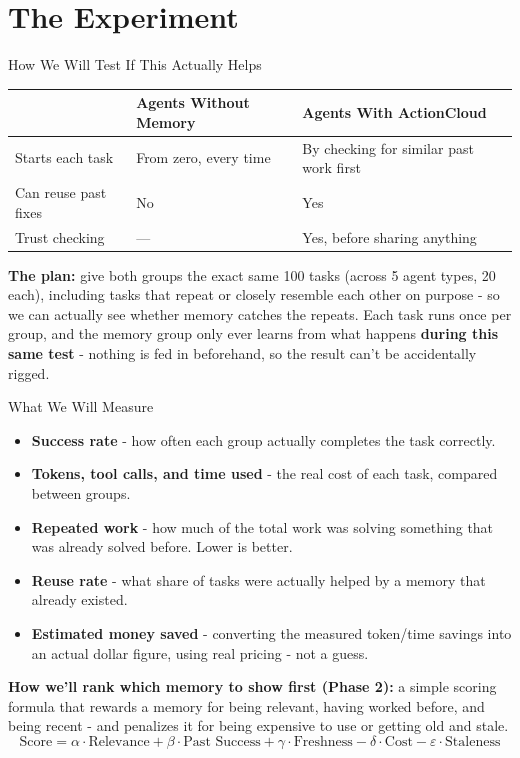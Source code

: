 \documentclass{beamer}
\begin{document}
\section{The Experiment}
\begin{frame}{How We Will Test If This Actually Helps}
\scriptsize
\setlength{\tabcolsep}{4pt}
\renewcommand{\arraystretch}{1.3}
\begin{tabular}{lll}
\toprule
\textbf{} & \textbf{Agents Without Memory} & \textbf{Agents With ActionCloud} \\
\midrule
Starts each task & From zero, every time & By checking for similar past work first \\
Can reuse past fixes & No & Yes \\
Trust checking & --- & Yes, before sharing anything \\
\bottomrule
\end{tabular}

\vspace{0.25cm}\normalsize
\textbf{The plan:} give both groups the exact same 100 tasks (across 5 agent types, 20 each), including tasks that repeat or closely resemble each other on purpose - so we can actually see whether memory catches the repeats. Each task runs once per group, and the memory group only ever learns from what happens \textbf{during this same test} - nothing is fed in beforehand, so the result can't be accidentally rigged.
\end{frame}

\begin{frame}{What We Will Measure}
\scriptsize
\begin{itemize}
    \item \textbf{Success rate} - how often each group actually completes the task correctly.
    \item \textbf{Tokens, tool calls, and time used} - the real cost of each task, compared between groups.
    \item \textbf{Repeated work} - how much of the total work was solving something that was already solved before. Lower is better.
    \item \textbf{Reuse rate} - what share of tasks were actually helped by a memory that already existed.
    \item \textbf{Estimated money saved} - converting the measured token/time savings into an actual dollar figure, using real pricing - not a guess.
\end{itemize}
\vspace{0.2cm}
\normalsize
\textbf{How we'll rank which memory to show first (Phase 2):} a simple scoring formula that rewards a memory for being relevant, having worked before, and being recent - and penalizes it for being expensive to use or getting old and stale.
\[
\text{Score} = \alpha \cdot \text{Relevance} + \beta \cdot \text{Past Success} + \gamma \cdot \text{Freshness} - \delta \cdot \text{Cost} - \varepsilon \cdot \text{Staleness}
\]
\end{frame}
\end{document}
